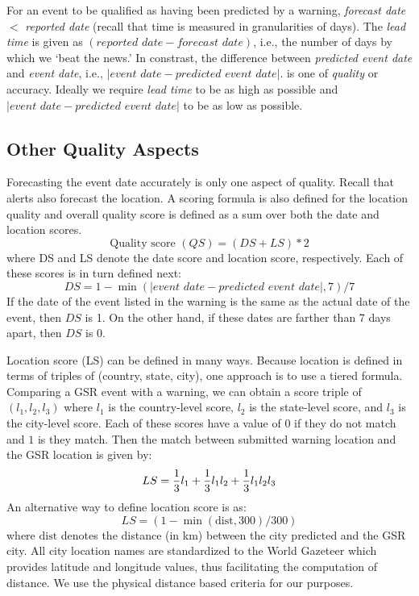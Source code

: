 For an event to be qualified as having been predicted by a warning,
{\it forecast date} $<$ {\it reported date}
(recall that time is measured in
granularities of days).
The {\it lead time} is given as
$(\textit{reported date} - \textit{forecast date})$, i.e., the number
of days by which we `beat the news.'
In constrast, the difference between
{\it predicted event date} and {\it event date}, i.e.,
$|\textit{event date} - \textit{predicted event date}|$.
is one of {\it quality} or accuracy.
Ideally we require {\it lead time} to be as high as possible and
$|\textit{event date} - \textit{predicted event date}|$ to be as low
as possible.

\subsection{Other Quality Aspects}
Forecasting the event date accurately is only one aspect of quality.
Recall that alerts also forecast the location. A scoring formula is also defined for the location quality and 
overall quality score is defined as a sum over both the date and location scores.
$$\textrm{Quality score } (QS) = (DS + LS)*2$$
where DS and LS denote the date score and location score, respectively.
Each of these scores is in turn defined next:
$$DS = 1 - \min(|\textit{event date} - \textit{predicted event date}|,7)/7$$
If the date of the event listed in the warning is the same as the
actual date of the event, then $DS$ is 1. On the other hand, if these dates
are farther than 7 days apart, then $DS$ is 0.

Location score (LS) can be defined in many ways. Because location is
defined in terms of triples of (country, state, city), one approach is
to use a tiered formula. Comparing a GSR event with a warning, we can
obtain a score triple of $(l_1, l_2, l_3)$ where $l_1$ is the
country-level score, $l_2$ is the state-level score, and $l_3$ is the
city-level score. Each of these scores have a value of $0$ if they
do not match and $1$ is they match. Then the match between submitted
warning location and the GSR location is given by:
$$LS = {1 \over 3} l_1 + {1 \over 3} l_1 l_2 + {1 \over 3} l_1 l_2 l_3$$
\noindent
An alternative way to define location score is as:
$$LS = (1 - \min(\textrm{dist},300)/300)$$
where $\textrm{dist}$ denotes the distance (in km) between the city predicted and
the GSR city. All city location names are standardized to the World Gazeteer which provides
latitude and longitude values, thus facilitating the computation of distance.
We use the physical distance based criteria for our purposes.

